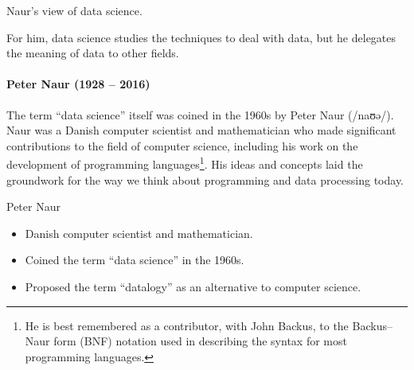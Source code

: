 \def\naurds{(0,0) circle (20mm)}
\def\naurcs{(0:5mm) circle (15mm)}
\def\naurde{(0:40mm) circle (15mm)}



\begin{figurebox}[label=fig:naur]{Naur's view of data science.}
  \centering
  \tcblower
    For him, data science studies the techniques to deal
    with data, but he delegates the meaning of data to other fields.
\end{figurebox}

\paragraph{Peter Naur (1928 -- 2016)}

The term ``data science'' itself was coined in the 1960s by Peter Naur (/naʊə/). Naur was
a Danish computer scientist and mathematician who made significant contributions to the
field of computer science, including his work on the development of programming
languages\footnote{He is best remembered as a contributor, with John Backus, to the
Backus–Naur form (BNF) notation used in describing the syntax for most programming
languages.}.
His ideas and concepts laid the groundwork for the way we think about programming and data
processing today.

\begin{mainbox}{Peter Naur}
  \begin{itemize}
    \item Danish computer scientist and mathematician.
    \item Coined the term ``data science'' in the 1960s.
    \item Proposed the term ``datalogy'' as an alternative to computer science.
  \end{itemize}
\end{mainbox}

